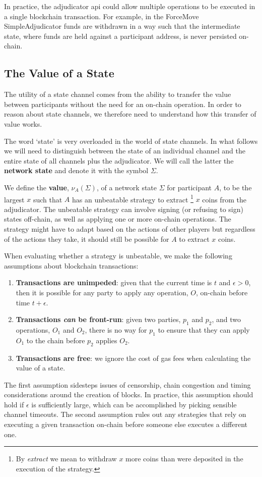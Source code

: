 \documentclass{article}
\begin{document}
In practice, the adjudicator api could allow multiple operations to be executed in a single blockchain transaction.
For example, in the ForceMove SimpleAdjudicator funds are withdrawn in a way such that  
the intermediate state, where funds are held against a participant address, is never persisted on-chain.

\subsection{The Value of a State}\label{section:value-of-a-state}

The utility of a state channel comes from the ability to transfer the value
between participants without the need for an on-chain operation.
In order to reason about state channels, we therefore need to understand how this transfer
of value works.

The word `state' is very overloaded in the world of state channels.
In what follows we will need to distinguish between the state of an individual channel and
the entire state of all channels plus the adjudicator.
We will call the latter the \textbf{network state} and denote it with the symbol $\Sigma$.

We define the \textbf{value}, $\nu_A(\Sigma)$, of a network state $\Sigma$ for participant $A$,
to be the largest $x$ such that $A$ has an unbeatable strategy to extract
\footnote{By \textit{extract} we mean to withdraw $x$ more coins than were deposited in the execution of the strategy.}
$x$ coins from the adjudicator.
The unbeatable strategy can involve signing (or refusing to sign) states off-chain, as well as
applying one or more on-chain operations.
The strategy might have to adapt based on the actions of other players but regardless of
the actions they take, it should still be possible for $A$ to extract $x$ coins.

When evaluating whether a strategy is unbeatable, we make the following assumptions about blockchain transactions:
\begin{enumerate}
  \item \textbf{Transactions are unimpeded}: given that the current time is $t$ and $\epsilon > 0$, then it is possible for any party to apply any operation, $O$, on-chain before time $t + \epsilon$.
  \item \textbf{Transactions \textit{can} be front-run}: given two parties, $p_1$ and $p_2$, and two operations, $O_1$ and $O_2$, there is no way for $p_1$ to ensure that they can apply $O_1$ to the chain before $p_2$ applies $O_2$.
  \item \textbf{Transactions are free}: we ignore the cost of gas fees when calculating the value of a state.
\end{enumerate}
The first assumption sidesteps issues of censorship, chain congestion and timing considerations around the creation of blocks.
In practice, this assumption should hold if $\epsilon$ is sufficiently large, which can be accomplished by picking sensible channel timeouts.
The second assumption rules out any strategies that rely on executing a given transaction on-chain before someone else executes a different one.
\end{document}
